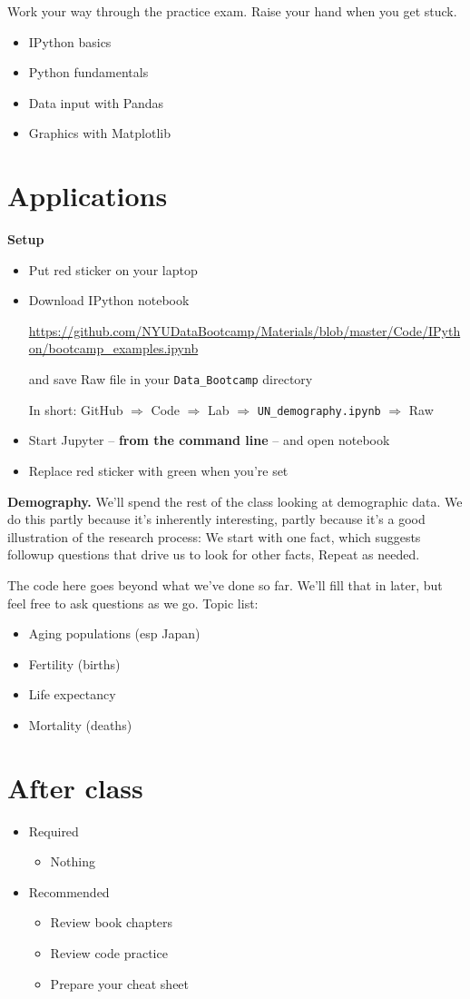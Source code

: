 \documentclass[11pt]{article}
\begin{document}
Work your way through the practice exam.  Raise your hand when you get stuck.
\begin{itemize}
\item IPython basics
\item Python fundamentals
\item Data input with Pandas
\item Graphics with Matplotlib
\end{itemize}


\section*{Applications}

{\bf Setup}
\begin{itemize}
\item Put red sticker on your laptop

\item Download IPython notebook

\url{https://github.com/NYUDataBootcamp/Materials/blob/master/Code/IPython/bootcamp_examples.ipynb} %

and save Raw file in your \verb|Data_Bootcamp| directory

In short:  GitHub $\Rightarrow$ Code $\Rightarrow$ Lab $\Rightarrow$ \verb|UN_demography.ipynb|
$\Rightarrow$ Raw

\item Start Jupyter -- {\bf from the command line} -- and open notebook
\item Replace red sticker with green when you're set
\end{itemize}

{\bf Demography.} 
We'll spend the rest of the class looking at demographic data.
We do this partly because it's inherently interesting,
partly because it's a good illustration of the research process:
We start with one fact, which suggests followup questions
that drive us to look for other facts,
Repeat as needed.

The code here goes beyond what we've done so far.  
We'll fill that in later, but feel free to ask questions
as we go. 
Topic list:   
\begin{itemize}
\item Aging populations (esp Japan)
\item Fertility (births)
\item Life expectancy
\item Mortality (deaths)
\end{itemize}


\section*{After class}

\begin{itemize}
\item Required
\begin{itemize}
\item Nothing
\end{itemize}
\item Recommended
\begin{itemize}
\item Review book chapters
\item Review code practice
\item Prepare your cheat sheet
\end{itemize}
\end{itemize}


\end{document}
